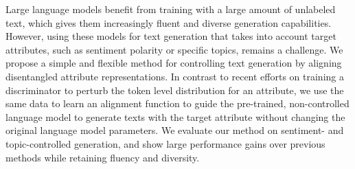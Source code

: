 Large language models benefit from training with a large amount of unlabeled text, which gives them increasingly fluent and diverse generation capabilities. However, using these models for text generation that takes into account target attributes, such as sentiment polarity or specific topics, remains a challenge. We propose a simple and flexible method for controlling text generation by aligning disentangled attribute representations. In contrast to recent efforts on training a discriminator to perturb the token level distribution for an attribute, we use the same data to learn an alignment function to guide the pre-trained, non-controlled language model to generate texts with the target attribute without changing the original language model parameters. We evaluate our method on sentiment- and topic-controlled generation, and show large performance gains over previous methods while retaining fluency and diversity.
